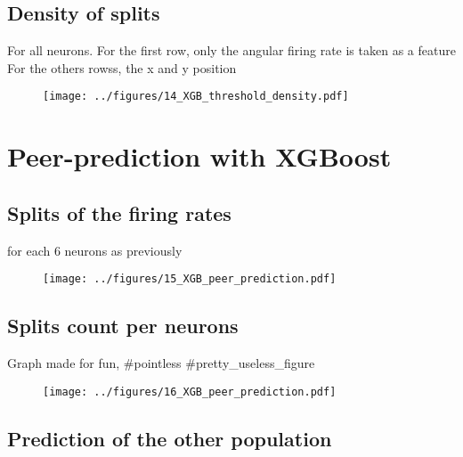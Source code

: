 \documentclass[10pt,a4paper,twocolumn]{article}
\begin{document}
\subsection{Density of splits}

For all neurons.
For the first row, only the angular firing rate is taken as a feature
For the others rowss, the x and y position

\begin{figure}[H]
	\begin{center}
		\texttt{[image: ../figures/14\_XGB\_threshold\_density.pdf]}
	\end{center}
\end{figure}




\section{Peer-prediction with XGBoost}

\subsection{Splits of the firing rates}

for each 6 neurons as previously


\begin{figure}[H]
	\begin{center}
		\texttt{[image: ../figures/15\_XGB\_peer\_prediction.pdf]}
	\end{center}
\end{figure}

\subsection{Splits count per neurons}

Graph made for fun, \#pointless \#pretty\_useless\_figure

\begin{figure}[H]
	\begin{center}
		\texttt{[image: ../figures/16\_XGB\_peer\_prediction.pdf]}
	\end{center}
\end{figure}

\subsection{Prediction of the other population}
\end{document}

